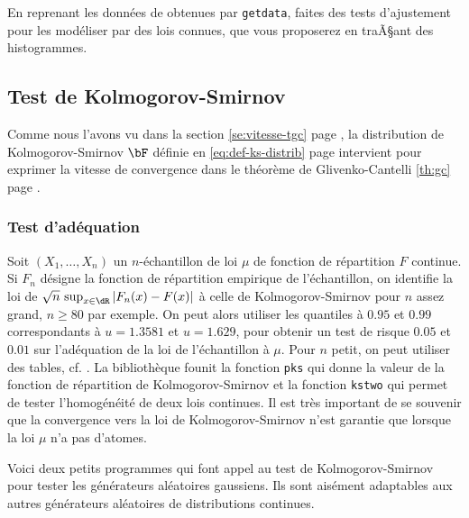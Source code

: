 \begin{exo}
  En reprenant les données de \SB{} obtenues par \texttt{getdata}, faites des
  tests d'ajustement pour les modéliser par des lois connues, que vous
  proposerez en traÃ§ant des histogrammes.
\end{exo}


%
\subsection{Test de Kolmogorov-Smirnov}\label{ss:test-ks}
%

Comme nous l'avons vu dans la section \ref{se:vitesse-tgc} page
\pageref{se:vitesse-tgc}, la distribution de Kolmogorov-Smirnov $\bF$ définie
en \eqref{eq:def-ks-distrib} page \pageref{eq:def-ks-distrib} intervient pour
exprimer la vitesse de convergence dans le théorème de Glivenko-Cantelli
\ref{th:gc} page \pageref{th:gc}.

\subsubsection{Test d'adéquation}

Soit $(X_1,\ldots,X_n)$ un $n$-échantillon de loi $\mu$ de fonction de répartition
$F$ continue. Si $F_n$ désigne la fonction de répartition empirique de
l'échantillon, on identifie la loi de $\sqrt{n}\,\sup _{x \in \dR}
|F_n(x)-F(x)|$ à celle de Kolmogorov-Smirnov pour $n$ assez grand, $n \geq 80$
par exemple. On peut alors utiliser les quantiles à $0.95$ et $0.99$
correspondants à $u=1.3581$ et $u=1.629$, pour obtenir un test de risque
$0.05$ et $0.01$ sur l'adéquation de la loi de l'échantillon à $\mu$. Pour $n$
petit, on peut utiliser des tables, cf. \cite{saporta}.  La bibliothèque \SB{}
founit la fonction \texttt{pks} qui donne la valeur de la fonction de
répartition de Kolmogorov-Smirnov et la fonction \texttt{kstwo} qui permet de
tester l'homogénéité de deux lois continues. Il est très important de se
souvenir que la convergence vers la loi de Kolmogorov-Smirnov n'est garantie
que lorsque la loi $\mu$ n'a pas d'atomes.

\begin{exo}
  Voici deux petits programmes \ML{} qui font appel au test de
  Kolmogorov-Smirnov pour tester les générateurs aléatoires gaussiens. Ils
  sont aisément adaptables aux autres générateurs aléatoires de distributions
  continues.
\end{exo}

